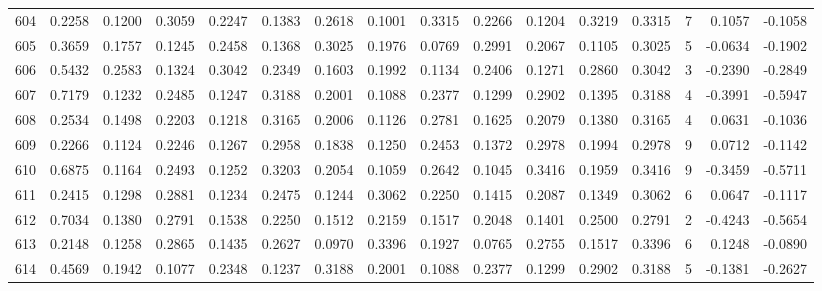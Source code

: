 \begin{tabular}{lrrrrrrrrrrrrrrr}
604 &      0.2258 &  0.1200 &  0.3059 &  0.2247 &  0.1383 &  0.2618 &  0.1001 &  0.3315 &  0.2266 &  0.1204 &   0.3219 &     0.3315 &      7 &                    0.1057 &                    -0.1058 \\
605 &      0.3659 &  0.1757 &  0.1245 &  0.2458 &  0.1368 &  0.3025 &  0.1976 &  0.0769 &  0.2991 &  0.2067 &   0.1105 &     0.3025 &      5 &                   -0.0634 &                    -0.1902 \\
606 &      0.5432 &  0.2583 &  0.1324 &  0.3042 &  0.2349 &  0.1603 &  0.1992 &  0.1134 &  0.2406 &  0.1271 &   0.2860 &     0.3042 &      3 &                   -0.2390 &                    -0.2849 \\
607 &      0.7179 &  0.1232 &  0.2485 &  0.1247 &  0.3188 &  0.2001 &  0.1088 &  0.2377 &  0.1299 &  0.2902 &   0.1395 &     0.3188 &      4 &                   -0.3991 &                    -0.5947 \\
608 &      0.2534 &  0.1498 &  0.2203 &  0.1218 &  0.3165 &  0.2006 &  0.1126 &  0.2781 &  0.1625 &  0.2079 &   0.1380 &     0.3165 &      4 &                    0.0631 &                    -0.1036 \\
609 &      0.2266 &  0.1124 &  0.2246 &  0.1267 &  0.2958 &  0.1838 &  0.1250 &  0.2453 &  0.1372 &  0.2978 &   0.1994 &     0.2978 &      9 &                    0.0712 &                    -0.1142 \\
610 &      0.6875 &  0.1164 &  0.2493 &  0.1252 &  0.3203 &  0.2054 &  0.1059 &  0.2642 &  0.1045 &  0.3416 &   0.1959 &     0.3416 &      9 &                   -0.3459 &                    -0.5711 \\
611 &      0.2415 &  0.1298 &  0.2881 &  0.1234 &  0.2475 &  0.1244 &  0.3062 &  0.2250 &  0.1415 &  0.2087 &   0.1349 &     0.3062 &      6 &                    0.0647 &                    -0.1117 \\
612 &      0.7034 &  0.1380 &  0.2791 &  0.1538 &  0.2250 &  0.1512 &  0.2159 &  0.1517 &  0.2048 &  0.1401 &   0.2500 &     0.2791 &      2 &                   -0.4243 &                    -0.5654 \\
613 &      0.2148 &  0.1258 &  0.2865 &  0.1435 &  0.2627 &  0.0970 &  0.3396 &  0.1927 &  0.0765 &  0.2755 &   0.1517 &     0.3396 &      6 &                    0.1248 &                    -0.0890 \\
614 &      0.4569 &  0.1942 &  0.1077 &  0.2348 &  0.1237 &  0.3188 &  0.2001 &  0.1088 &  0.2377 &  0.1299 &   0.2902 &     0.3188 &      5 &                   -0.1381 &                    -0.2627 \\

\end{tabular}
